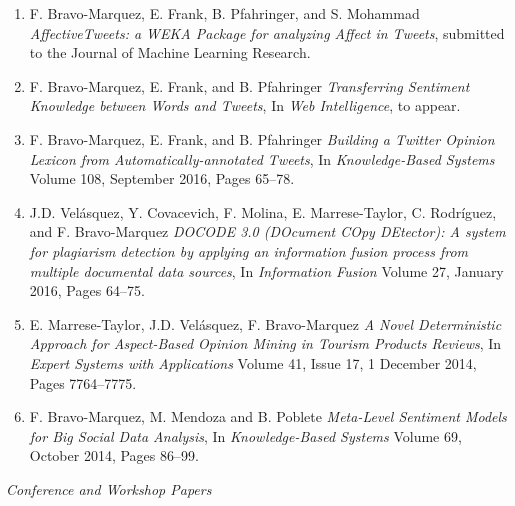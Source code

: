 \documentclass[letterpaper]{article}
\begin{document}
\begin{enumerate}

\item F. Bravo-Marquez, E. Frank, B. Pfahringer, and S. Mohammad  \textit{AffectiveTweets: a WEKA Package for analyzing Affect in Tweets}, submitted to the Journal of
Machine Learning Research.

\item F. Bravo-Marquez, E. Frank, and B. Pfahringer \textit{Transferring Sentiment Knowledge between Words and Tweets}, In \textit{Web Intelligence}, to appear.

\item F. Bravo-Marquez, E. Frank, and B. Pfahringer \textit{Building a Twitter Opinion Lexicon from Automatically-annotated Tweets}, In \textit{Knowledge-Based Systems}  Volume 108, September 2016, Pages 65–78.

\item J.D. Velásquez, Y. Covacevich, F. Molina, E. Marrese-Taylor, C. Rodríguez, and F. Bravo-Marquez \textit{DOCODE 3.0 (DOcument COpy DEtector): A system for plagiarism detection by applying an information fusion process from multiple documental data sources}, In \textit{Information Fusion} Volume 27, January 2016, Pages 64–75. 


\item E. Marrese-Taylor, J.D. Velásquez, F. Bravo-Marquez \textit{A Novel Deterministic Approach for Aspect-Based Opinion Mining in Tourism Products Reviews}, In \textit{Expert Systems with Applications} Volume 41, Issue 17, 1 December 2014, Pages 7764–7775. 


\item F. Bravo-Marquez, M. Mendoza and B. Poblete \textit{Meta-Level Sentiment Models for Big Social Data Analysis}, In \textit{Knowledge-Based Systems} Volume 69, October 2014, Pages 86–99. 

\end{enumerate}


\begin{flushleft}
\emph{Conference and Workshop Papers}
\end{flushleft}
\end{document}
